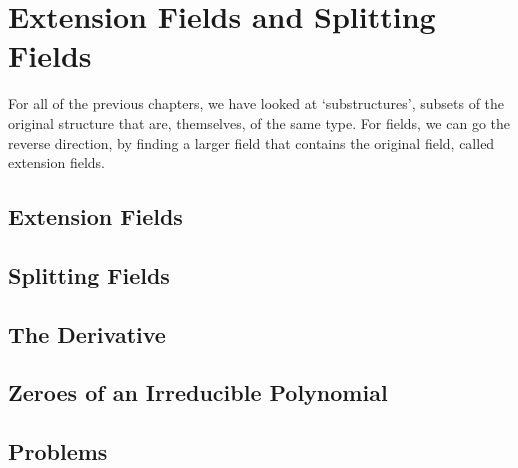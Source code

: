 \chapter{Extension Fields and Splitting Fields}
For all of the previous chapters, we have looked at `substructures', subsets of the original structure that are, themselves, of the same type. For fields, we can go the reverse direction, by finding a larger field that contains the original field, called extension fields.

\section{Extension Fields}

\section{Splitting Fields}

\section{The Derivative}

\section{Zeroes of an Irreducible Polynomial}

\newpage

\section{Problems}
